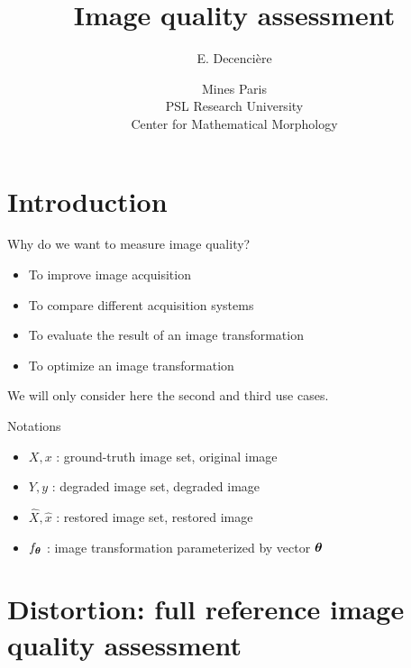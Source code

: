 \documentclass[xcolor=pdftex,dvipsnames,table,mathserif]{beamer}
\title{Image quality assessment}
\author{E. Decencière}
\date{Mines Paris\\
  PSL Research University\\
  Center for Mathematical Morphology
}
\begin{document}
\frame{\titlepage}


\section{Introduction}

\begin{frame}{Why do we want to measure image quality?}

  \pause

  \begin{itemize}[<+->]
    \item To improve image acquisition
    \item To compare different acquisition systems
    \item To evaluate the result of an image transformation
    \item To optimize an image transformation
  \end{itemize}

  \pause

  \begin{block}{}
    We will only consider here the second and third use cases.
  \end{block}

\end{frame}



\begin{frame}{Notations}

\begin{itemize}[<+->]
\item $X, x$ : ground-truth image set, original image
\item $Y, y$ : degraded image set, degraded image
\item $\hat{X}, \hat{x}$ : restored image set, restored image
\item $f_{\boldsymbol{\theta}}$ : image transformation parameterized by vector $\boldsymbol{\theta}$
\end{itemize}

\end{frame}


\section{Distortion: full reference image quality assessment}
\end{document}
